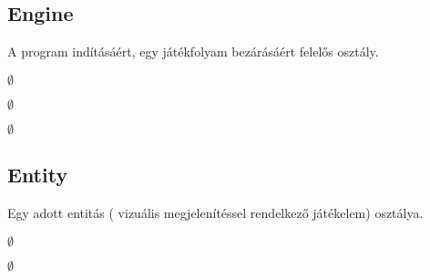 \subsection{Engine}
\begin{class-template-responsibility}
A program indításáért, egy játékfolyam bezárásáért felelős osztály. 
\end{class-template-responsibility}
\begin{class-template-interface}
$\emptyset$
\end{class-template-interface}
\begin{class-template-baseclass}
$\emptyset$
\end{class-template-baseclass}
\begin{class-template-attribute}
\item[] $\emptyset$
\end{class-template-attribute}
\begin{class-template-method}
\end{class-template-method}


\subsection{Entity}
\begin{class-template-responsibility}
Egy adott entitás ( vizuális megjelenítéssel rendelkező játékelem) osztálya. 
\end{class-template-responsibility}
\begin{class-template-interface}
$\emptyset$
\end{class-template-interface}
\begin{class-template-baseclass}
$\emptyset$
\end{class-template-baseclass}
\begin{class-template-attribute}
\end{class-template-attribute}
\begin{class-template-method}
\end{class-template-method}


